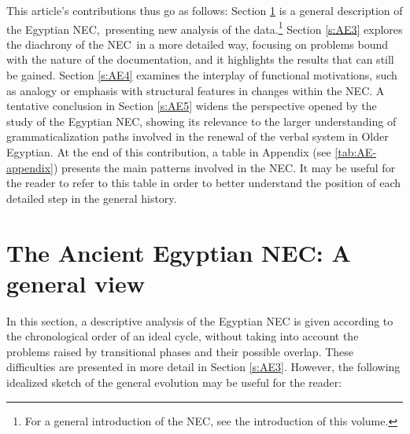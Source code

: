 \documentclass[output=paper]{langsci/langscibook}
\begin{document}
This article’s contributions thus go as follows: Section \ref{s:AE2} is a general description of the Egyptian NEC, presenting new analysis of the data.\footnote{ For a general introduction of the NEC, see the introduction of this volume.} Section \ref{s:AE3} explores the diachrony of the NEC in a more detailed way, focusing on problems bound with the nature of the documentation, and it highlights the results that can still be gained. Section \ref{s:AE4} examines the interplay of functional motivations, such as analogy or emphasis with structural features in changes within the NEC. A tentative conclusion in Section \ref{s:AE5} widens the perspective opened by the study of the Egyptian NEC, showing its relevance to the larger understanding of grammaticalization paths involved in the renewal of the verbal system in Older Egyptian. At the end of this contribution, a table in Appendix (see \ref{tab:AE-appendix}) presents the main patterns involved in the NEC. It may be useful for the reader to refer to this table in order to better understand the position of each detailed step in the general history. 


\section{The Ancient Egyptian NEC: A general view}\label{s:AE2}

In this section, a descriptive analysis of the Egyptian NEC is given according to the chronological order of an ideal cycle, without taking into account the problems raised by transitional phases and their possible overlap. These difficulties are presented in more detail in Section \ref{s:AE3}. However, the following idealized sketch of the general evolution may be useful for the reader: 
\end{document}

